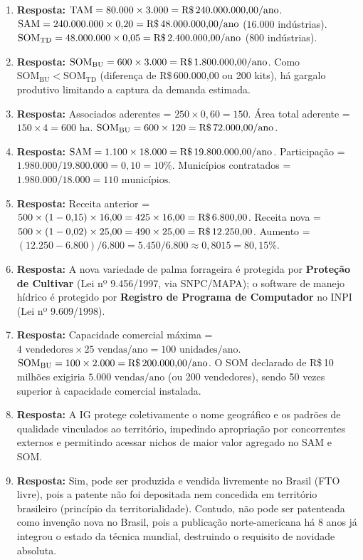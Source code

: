 \begin{boxGabarito}
\begin{enumerate}[leftmargin=1.5em, itemsep=4pt]
    \item \textbf{Resposta:} $\text{TAM} = 80.000 \times 3.000 = \text{R\$\,240.000.000,00/ano}$. $\text{SAM} = 240.000.000 \times 0{,}20 = \text{R\$\,48.000.000,00/ano}$ ($16.000$ indústrias). $\text{SOM}_{\text{TD}} = 48.000.000 \times 0{,}05 = \text{R\$\,2.400.000,00/ano}$ ($800$ indústrias).
    \item \textbf{Resposta:} $\text{SOM}_{\text{BU}} = 600 \times 3.000 = \text{R\$\,1.800.000,00/ano}$. Como $\text{SOM}_{\text{BU}} < \text{SOM}_{\text{TD}}$ (diferença de R\$\,600.000,00 ou 200 kits), há gargalo produtivo limitando a captura da demanda estimada.
    \item \textbf{Resposta:} Associados aderentes = $250 \times 0{,}60 = 150$. Área total aderente = $150 \times 4 = 600\text{ ha}$. $\text{SOM}_{\text{BU}} = 600 \times 120 = \text{R\$\,72.000,00/ano}$.
    \item \textbf{Resposta:} $\text{SAM} = 1.100 \times 18.000 = \text{R\$\,19.800.000,00/ano}$. Participação = $1.980.000 / 19.800.000 = 0{,}10 = 10\%$. Municípios contratados = $1.980.000 / 18.000 = 110\text{ municípios}$.
    \item \textbf{Resposta:} Receita anterior = $500 \times (1 - 0{,}15) \times 16{,}00 = 425 \times 16{,}00 = \text{R\$\,6.800,00}$. Receita nova = $500 \times (1 - 0{,}02) \times 25{,}00 = 490 \times 25{,}00 = \text{R\$\,12.250,00}$. Aumento = $(12.250 - 6.800) / 6.800 = 5.450 / 6.800 \approx 0{,}8015 = 80{,}15\%$.
    \item \textbf{Resposta:} A nova variedade de palma forrageira é protegida por \textbf{Proteção de Cultivar} (Lei nº 9.456/1997, via SNPC/MAPA); o software de manejo hídrico é protegido por \textbf{Registro de Programa de Computador} no INPI (Lei nº 9.609/1998).
    \item \textbf{Resposta:} Capacidade comercial máxima = $4\text{ vendedores} \times 25\text{ vendas/ano} = 100\text{ unidades/ano}$. $\text{SOM}_{\text{BU}} = 100 \times 2.000 = \text{R\$\,200.000,00/ano}$. O SOM declarado de R\$\,10 milhões exigiria $5.000\text{ vendas/ano}$ (ou 200 vendedores), sendo 50 vezes superior à capacidade comercial instalada.
    \item \textbf{Resposta:} A IG protege coletivamente o nome geográfico e os padrões de qualidade vinculados ao território, impedindo apropriação por concorrentes externos e permitindo acessar nichos de maior valor agregado no SAM e SOM.
    \item \textbf{Resposta:} Sim, pode ser produzida e vendida livremente no Brasil (FTO livre), pois a patente não foi depositada nem concedida em território brasileiro (princípio da territorialidade). Contudo, não pode ser patenteada como invenção nova no Brasil, pois a publicação norte-americana há 8 anos já integrou o estado da técnica mundial, destruindo o requisito de novidade absoluta.

\end{enumerate}
\end{boxGabarito}
